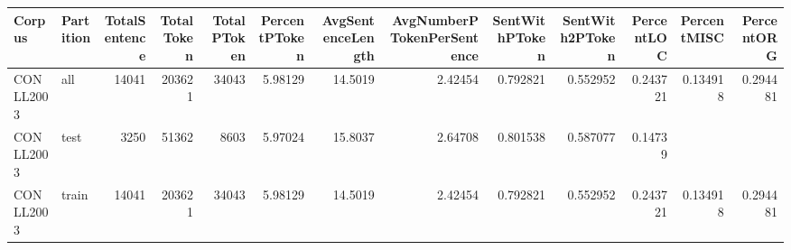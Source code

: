 \begin{tabular}{llrrrrrrrrrrr}
\hline
 Corpus    & Partition   &   TotalSentence &   TotalToken &   TotalPToken &   PercentPToken &   AvgSentenceLength &   AvgNumberPTokenPerSentence &   SentWithPToken &   SentWith2PToken &   PercentLOC &   PercentMISC &   PercentORG \\
\hline
 CONLL2003 & all         &           14041 &       203621 &         34043 &         5.98129 &             14.5019 &                      2.42454 &         0.792821 &          0.552952 &     0.243721 &      0.134918 &     0.294481 \\
 CONLL2003 & test        &            3250 &        51362 &          8603 &         5.97024 &             15.8037 &                      2.64708 &         0.801538 &          0.587077 &     0.14739  &               &              \\
 CONLL2003 & train       &           14041 &       203621 &         34043 &         5.98129 &             14.5019 &                      2.42454 &         0.792821 &          0.552952 &     0.243721 &      0.134918 &     0.294481 \\
\hline
\end{tabular}